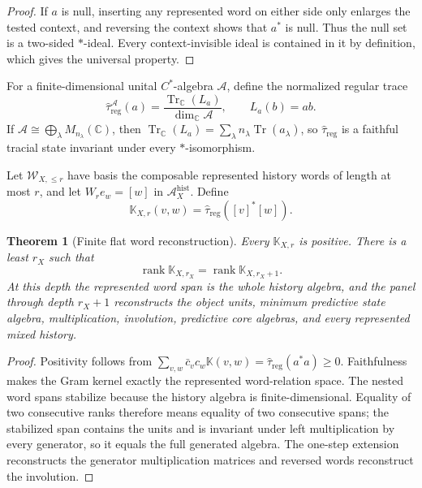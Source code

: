 \documentclass[11pt]{article}
\newtheorem{theorem}{Theorem}[section]
\theoremstyle{definition}
\theoremstyle{remark}
\newcommand{\C}{\mathbb C}
\newcommand{\Tr}{\operatorname{Tr}}
\newcommand{\rank}{\operatorname{rank}}
\begin{document}
\begin{proof}
If $a$ is null, inserting any represented word on either side only enlarges the
tested context, and reversing the context shows that $a^*$ is null.  Thus the
null set is a two-sided $*$-ideal.  Every context-invisible ideal is contained
in it by definition, which gives the universal property.
\end{proof}

For a finite-dimensional unital $C^*$-algebra $\mathcal A$, define the
normalized regular trace
\begin{equation}
 \widehat\tau_{\mathrm{reg}}^{\mathcal A}(a)
 =\frac{\Tr_{\C}(L_a)}{\dim_{\C}\mathcal A},
 \qquad L_a(b)=ab.
 \label{eq:supp-regular-trace}
\end{equation}
If $\mathcal A\cong\bigoplus_\lambda M_{n_\lambda}(\C)$, then
$\Tr_{\C}(L_a)=\sum_\lambda n_\lambda\Tr(a_\lambda)$, so
$\widehat\tau_{\mathrm{reg}}$ is a faithful tracial state invariant under every
$*$-isomorphism.

Let $\mathcal W_{X,\le r}$ have basis the composable represented history words
of length at most $r$, and let $W_re_w=[w]$ in
$\mathcal A_X^{\mathrm{hist}}$.  Define
\begin{equation}
 \mathbb K_{X,r}(v,w)
 =\widehat\tau_{\mathrm{reg}}([v]^*[w]).
 \label{eq:supp-word-gram}
\end{equation}

\begin{theorem}[Finite flat word reconstruction]
\label{thm:supp-word-flatness}
Every $\mathbb K_{X,r}$ is positive.  There is a least $r_X$ such that
\begin{equation}
 \rank\mathbb K_{X,r_X}=\rank\mathbb K_{X,r_X+1}.
 \label{eq:supp-flat-stop}
\end{equation}
At this depth the represented word span is the whole history algebra, and the
panel through depth $r_X+1$ reconstructs the object units, minimum predictive
state algebra, multiplication, involution, predictive core algebras, and every
represented mixed history.
\end{theorem}

\begin{proof}
Positivity follows from
$\sum_{v,w}\bar c_vc_w\mathbb K(v,w)
=\widehat\tau_{\mathrm{reg}}(a^*a)\ge0$.  Faithfulness makes the Gram kernel
exactly the represented word-relation space.  The nested word spans stabilize
because the history algebra is finite-dimensional.  Equality of two
consecutive ranks therefore means equality of two consecutive spans; the
stabilized span contains the units and is invariant under left multiplication
by every generator, so it equals the full generated algebra.  The one-step
extension reconstructs the generator multiplication matrices and reversed
words reconstruct the involution.
\end{proof}
\end{document}

